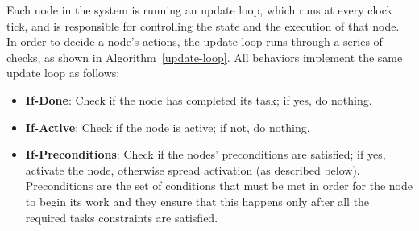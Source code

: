 \documentclass[conference]{article}
\begin{document}
Each node in the system is running an update loop, which runs at every clock tick, and is responsible for controlling the state and the execution of that node. In order to decide a node's actions, the update loop runs through a series of checks, as shown in Algorithm~\ref{update-loop}. All behaviors implement the same update loop as follows:

\begin{itemize}

  \item \textbf{If-Done}: Check if the node has completed its task; if yes, do nothing.
  \item \textbf{If-Active}: Check if the node is active; if not, do nothing.
  \item \textbf{If-Preconditions}: Check if the nodes' preconditions are satisfied; if yes, activate the node, otherwise spread activation (as described below). Preconditions are the set of conditions that must be met in order for the node to begin its work and they ensure that this happens only after all the required tasks constraints are satisfied.
\end{itemize}
  
\end{document}
